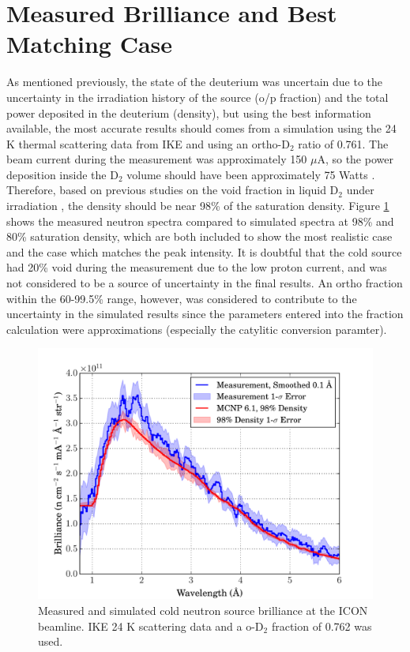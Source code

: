 \documentclass[5p,12pt]{elsarticle}
\begin{document}
%
%
%
%
%

\section{Measured Brilliance and Best Matching Case}
\label{sec:results}

As mentioned previously, the state of the deuterium was uncertain due to the uncertainty in the irradiation history of the source (o/p fraction) and the total power deposited in the deuterium (density), but using the best information available, the most accurate results should comes from a simulation using the 24 K thermal scattering data from IKE and using an ortho-D$_2$ ratio of 0.761.  The beam current during the measurement was approximately 150 $\mu$A, so the power deposition inside the D$_2$ volume should have been approximately 75 Watts \cite{sinq_power}.  Therefore, based on previous studies on the void fraction in liquid D$_2$ under irradiation \cite{Siegwarth_Olson_Lewis_Rowe_Williams_1994}, the density should be near 98\% of the saturation density.  Figure \ref{fig:brilliance} shows the measured neutron spectra compared to simulated spectra at 98\% and 80\% saturation density, which are both included to show the most realistic case and the case which matches the peak intensity.  It is doubtful that the cold source had 20\% void during the measurement due to the low proton current, and was not considered to be a source of uncertainty in the final results.  An ortho fraction within the 60-99.5\% range, however, was considered to contribute to the uncertainty in the simulated results since the parameters entered into the fraction calculation were approximations (especially the catylitic conversion paramter). 

\begin{figure}[h!] 
  \centering
    \includegraphics[width=\columnwidth]{graphics/brightness.pdf}
     \caption{Measured and simulated cold neutron source brilliance at the ICON beamline.  IKE 24 K scattering data and a o-D$_2$ fraction of 0.762 was used. \label{fig:brilliance} }
\end{figure}
\end{document}
